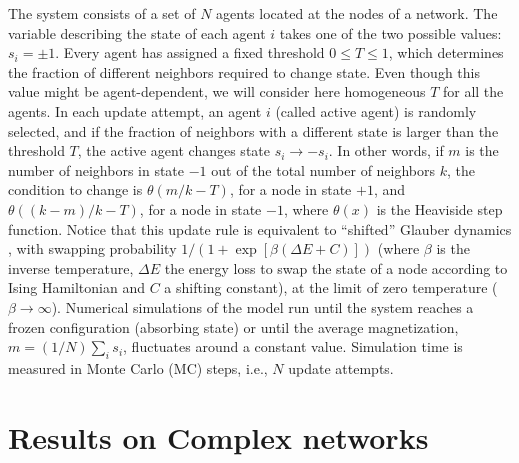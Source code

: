 The system consists of a set of $N$ agents located at the nodes of a network. The variable describing the state of each agent $i$ takes one of the two possible values: $s_i = \pm 1$. Every agent has assigned a fixed threshold $0 \leq T \leq 1$, which determines the fraction of different neighbors required to change state. Even though this value might be agent-dependent, we will consider here homogeneous $T$ for all the agents. In each update attempt, an agent $i$ (called active agent) is randomly selected, and if the fraction of neighbors with a different state is larger than the threshold $T$, the active agent changes state $s_i \to -s_i$. In other words, if $m$ is the number of neighbors in state $-1$ out of the total number of neighbors $k$, the condition to change is $\theta(m/k - T)$, for a node in state $+1$, and $\theta((k-m)/k - T)$, for a node in state $-1$, where $\theta(x)$ is the Heaviside step function. Notice that this update rule is equivalent to ``shifted'' Glauber dynamics \cite{glauber1963time}, with swapping probability $1/(1+\exp[\beta(\Delta E + C)])$ (where $\beta$ is the inverse temperature, $\Delta E$ the energy loss to swap the state of a node according to Ising Hamiltonian and $C$ a shifting constant), at the limit of zero temperature ($\beta \to \infty$). Numerical simulations of the model run until the system reaches a frozen configuration (absorbing state) or until the average magnetization, $m = (1/N) \sum_i s_i$, fluctuates around a constant value.   Simulation time is measured in Monte Carlo (MC) steps, i.e., $N$ update attempts. 

\section{\label{sec:Results on Complex networks} Results on Complex networks}

